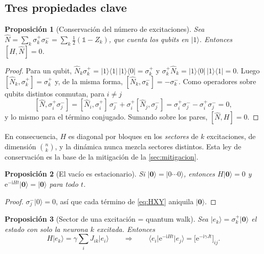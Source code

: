 \documentclass[11pt,a4paper]{article}
\renewcommand{\ket}[1]{\lvert #1\rangle}
\renewcommand{\bra}[1]{\langle #1\rvert}
\renewcommand{\proj}[1]{\lvert #1\rangle\!\langle #1\rvert}
\newcommand{\vac}{\ket{\mathbf{0}}}
\newcommand{\e}{\mathrm{e}}
\newcommand{\ii}{\mathrm{i}}
\newcommand{\Nop}{\hat N}
\theoremstyle{plain}
\newtheorem{proposicion}{Proposición}[section]
\theoremstyle{definition}
\theoremstyle{remark}
\begin{document}
\subsection{Tres propiedades clave}

\begin{proposicion}[Conservación del número de excitaciones]\label{prop:conservacion}
Sea $\Nop=\sum_k \sigma_k^+\sigma_k^- = \sum_k \tfrac12(\mathbb 1 - Z_k)$, que cuenta los qubits en $\ket1$. Entonces $[H,\Nop]=0$.
\end{proposicion}

\begin{proof}
Para un qubit, $\Nop_k\sigma_k^+ = \proj1\,\ket1\!\bra0 = \sigma_k^+$ y $\sigma_k^+\Nop_k = \ket1\!\bra0\,\proj1 = 0$. Luego $[\Nop_k,\sigma_k^+] = \sigma_k^+$ y, de la misma forma, $[\Nop_k,\sigma_k^-]=-\sigma_k^-$. Como operadores sobre qubits distintos conmutan, para $i\ne j$
\[
[\Nop,\sigma_i^+\sigma_j^-] = [\Nop_i,\sigma_i^+]\,\sigma_j^- + \sigma_i^+[\Nop_j,\sigma_j^-] = \sigma_i^+\sigma_j^- - \sigma_i^+\sigma_j^- = 0,
\]
y lo mismo para el término conjugado. Sumando sobre los pares, $[\Nop,H]=0$.
\end{proof}

En consecuencia, $H$ es diagonal por bloques en los \emph{sectores} de $k$ excitaciones, de dimensión $\binom{n}{k}$, y la dinámica nunca mezcla sectores distintos. Esta ley de conservación es la base de la mitigación de la \cref{sec:mitigacion}.

\begin{proposicion}[El vacío es estacionario]\label{prop:vacio}
Si $\vac=\ket{0\cdots0}$, entonces $H\vac=0$ y $\e^{-\ii Ht}\vac=\vac$ para todo $t$.
\end{proposicion}

\begin{proof}
$\sigma_j^-\ket0=0$, así que cada término de \eqref{eq:HXY} aniquila $\vac$.
\end{proof}

\begin{proposicion}[Sector de una excitación = quantum walk]\label{prop:ctqw}
Sea $\ket{e_k}=\sigma_k^+\vac$ el estado con solo la neurona $k$ excitada. Entonces
\begin{equation}
H\ket{e_k} = \gamma\sum_i J_{ik}\ket{e_i}
\qquad\Longrightarrow\qquad
\bra{e_i}\e^{-\ii Ht}\ket{e_j} = \bigl[\e^{-\ii\gamma Jt}\bigr]_{ij}.
\label{eq:ctqw}
\end{equation}
\end{proposicion}
\end{document}
